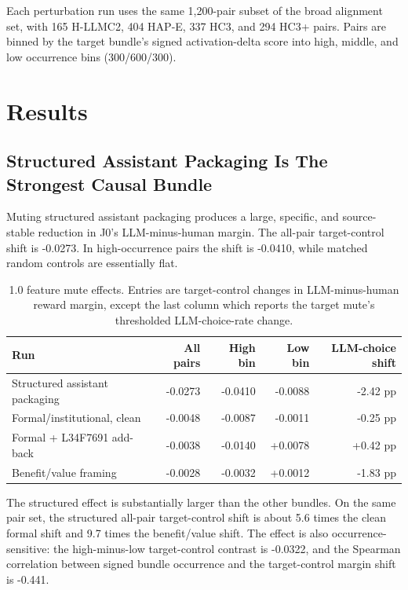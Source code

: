 \documentclass[11pt]{article}
\begin{document}
Each perturbation run uses the same 1,200-pair subset of the broad alignment
set, with 165 H-LLMC2, 404 HAP-E, 337 HC3, and 294 HC3+ pairs. Pairs are binned
by the target bundle's signed activation-delta score into high, middle, and low
occurrence bins (300/600/300).

\section{Results}

\subsection{Structured Assistant Packaging Is The Strongest Causal Bundle}

Muting structured assistant packaging produces a large, specific, and
source-stable reduction in J0's LLM-minus-human margin. The all-pair
target-control shift is -0.0273. In high-occurrence pairs the shift is -0.0410,
while matched random controls are essentially flat.

\begin{table}[h]
\centering
\small
\begin{tabular}{lrrrr}
\toprule
Run & All pairs & High bin & Low bin & LLM-choice shift \\
\midrule
Structured assistant packaging & -0.0273 & -0.0410 & -0.0088 & -2.42 pp \\
Formal/institutional, clean & -0.0048 & -0.0087 & -0.0011 & -0.25 pp \\
Formal + L34F7691 add-back & -0.0038 & -0.0140 & +0.0078 & +0.42 pp \\
Benefit/value framing & -0.0028 & -0.0032 & +0.0012 & -1.83 pp \\
\bottomrule
\end{tabular}
\caption{1.0 feature mute effects. Entries are target-control changes in
LLM-minus-human reward margin, except the last column which reports the target
mute's thresholded LLM-choice-rate change.}
\label{tab:perturbation-main}
\end{table}

The structured effect is substantially larger than the other bundles. On the
same pair set, the structured all-pair target-control shift is about 5.6 times
the clean formal shift and 9.7 times the benefit/value shift. The effect is
also occurrence-sensitive: the high-minus-low target-control contrast is
-0.0322, and the Spearman correlation between signed bundle occurrence and the
target-control margin shift is -0.441.
\end{document}
